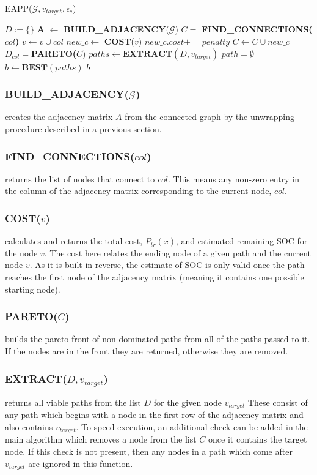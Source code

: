 \documentclass[journal]{IEEEtran}
\newcounter{row}
\newcounter{col}
\begin{document}
\textsc{EAPP}($\mathcal{G}, v_{target}, \epsilon_c$)
\begin{algorithmic}[1]
\STATE $D:=\{\}$ 
\STATE \textbf{A} $\leftarrow$ \textbf{BUILD\_ADJACENCY}($\mathcal{G}$)
\STATE $C =$ \textbf{FIND\_CONNECTIONS($col$)}
\STATE $v  \leftarrow v \cup col$ 
\STATE $new\_c \leftarrow$ \textbf{COST}($v$)
\STATE $new\_c.cost += penalty $ 
\ENDIF
\STATE $C \leftarrow C \cup new\_c$ 
\STATE $D_{col} = $\textbf{PARETO($C)$}
\ENDFOR
\ENDFOR
\STATE $paths \leftarrow \textbf{EXTRACT}(D, v_{target})$
\STATE $path = \emptyset$
\ENDIF
\ENDFOR
\STATE $b \leftarrow \textbf{BEST}(paths)$
\RETURN $b$
\end{algorithmic}

\subsubsection{BUILD\_ADJACENCY($\mathcal{G}$)} creates the adjacency matrix $A$ from the connected graph by the unwrapping procedure described in a previous section.
\subsubsection{FIND\_CONNECTIONS($col$)} returns the list of nodes that connect to $col$. This means any non-zero entry in the column of the adjacency matrix corresponding to the current node, $col$.
\subsubsection{COST($v$)} calculates and returns the total cost, $P_{tr}(x)$, and estimated remaining SOC for the node $v$. The cost here relates the ending node of a given path and the current node $v$. As it is built in reverse, the estimate of SOC is only valid once the path reaches the first node of the adjacency matrix (meaning it contains one possible starting node).
\subsubsection{PARETO($C$)} builds the pareto front of non-dominated paths from all of the paths passed to it. If the nodes are in the front they are returned, otherwise they are removed.
\subsubsection{EXTRACT($D, v_{target}$)} returns all viable paths from the list $D$ for the given node $v_{target}$
These consist of any path which begins with a node in the first row of the adjacency matrix and also contains $v_{target}$. 
To speed execution, an additional check can be added in the main algorithm which removes a node from the list $C$ once it contains the target node. 
If this check is not present, then any nodes in a path which come after $v_{target}$ are ignored in this function.
\end{document}

